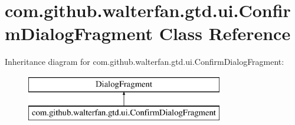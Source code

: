 \hypertarget{classcom_1_1github_1_1walterfan_1_1gtd_1_1ui_1_1ConfirmDialogFragment}{\section{com.\-github.\-walterfan.\-gtd.\-ui.\-Confirm\-Dialog\-Fragment Class Reference}
\label{classcom_1_1github_1_1walterfan_1_1gtd_1_1ui_1_1ConfirmDialogFragment}
}
Inheritance diagram for com.\-github.\-walterfan.\-gtd.\-ui.\-Confirm\-Dialog\-Fragment\-:\begin{figure}[H]
\begin{center}
\leavevmode
\includegraphics[height=2.000000cm]{classcom_1_1github_1_1walterfan_1_1gtd_1_1ui_1_1ConfirmDialogFragment}
\end{center}
\end{figure}
